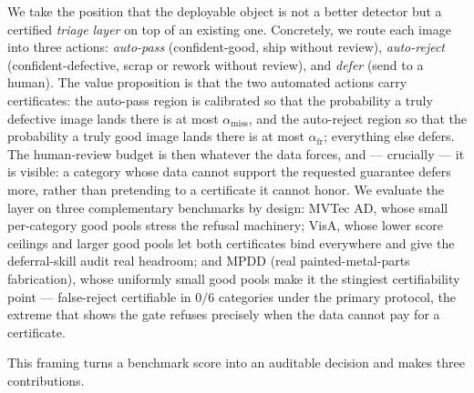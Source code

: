 \documentclass[11pt]{article}
\begin{document}
We take the position that the deployable object is not a better detector but a certified
\emph{triage layer} on top of an existing one. Concretely, we route each image into three actions:
\emph{auto-pass} (confident-good, ship without review), \emph{auto-reject} (confident-defective,
scrap or rework without review), and \emph{defer} (send to a human). The value proposition is that
the two automated actions carry certificates: the auto-pass region is calibrated so that the
probability a truly defective image lands there is at most $\alpha_{\text{miss}}$, and the
auto-reject region so that the probability a truly good image lands there is at most
$\alpha_{\text{fr}}$; everything else defers. The human-review budget is then whatever the data
forces, and --- crucially --- it is visible: a category whose data cannot support the
requested guarantee defers more, rather than pretending to a certificate it cannot honor.
We evaluate the layer on three complementary benchmarks by design: MVTec AD, whose small
per-category good pools stress the refusal machinery; VisA, whose lower score ceilings and
larger good pools let both certificates bind everywhere and give the deferral-skill audit real
headroom; and MPDD (real painted-metal-parts fabrication), whose uniformly small good pools make
it the stingiest certifiability point --- false-reject certifiable in $0/6$ categories under the
primary protocol, the extreme that shows the gate refuses precisely when the data cannot pay for
a certificate.

This framing turns a benchmark score into an auditable decision and makes three contributions.
\end{document}
